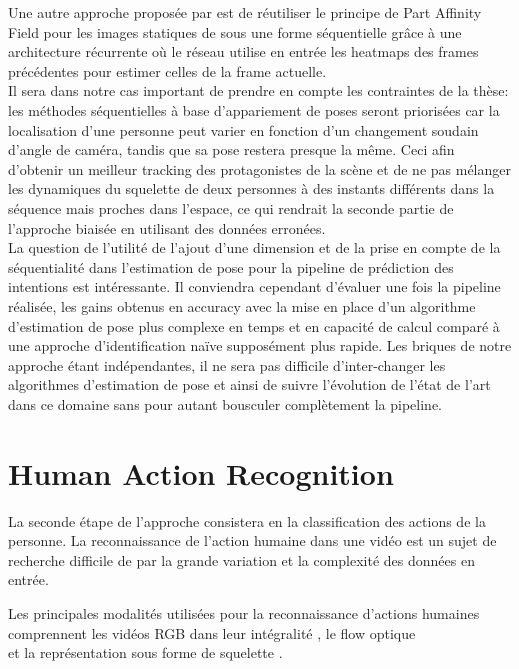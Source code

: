 Une autre approche proposée par \cite{Raaj_2019_CVPR} est de réutiliser le principe de Part Affinity Field pour les images statiques de \cite{cao2017realtime} sous une forme séquentielle grâce à une architecture récurrente où le réseau utilise en entrée les heatmaps des frames précédentes pour estimer celles de la frame actuelle.\\

Il sera dans notre cas important de prendre en compte les contraintes de la thèse: les méthodes séquentielles à base d'appariement de poses seront priorisées car la localisation d'une personne peut varier en fonction d'un changement soudain d'angle de caméra, tandis que sa pose restera presque la même. Ceci afin d'obtenir un meilleur tracking des protagonistes de la scène et de ne pas mélanger les dynamiques du squelette de deux personnes à des instants différents dans la séquence mais proches dans l'espace, ce qui rendrait la seconde partie de l'approche biaisée en utilisant des données erronées.\\

La question de l'utilité de l'ajout d'une dimension et de la prise en compte de la séquentialité dans l'estimation de pose pour la pipeline de prédiction des intentions est intéressante. Il conviendra cependant d'évaluer une fois la pipeline réalisée, les gains obtenus en accuracy avec la mise en place d'un algorithme d'estimation de pose plus complexe en temps et en capacité de calcul comparé à une approche d'identification naïve supposément plus rapide. Les briques de notre approche étant indépendantes, il ne sera pas difficile d'inter-changer les algorithmes d'estimation de pose et ainsi de suivre l'évolution de l'état de l'art dans ce domaine sans pour autant bousculer complètement la pipeline.

\section{Human Action Recognition}
\label{subsec:HAR}

La seconde étape de l'approche consistera en la classification des actions de la personne. La reconnaissance de l'action humaine dans une vidéo est un sujet de recherche difficile de par la grande variation et la complexité des données en entrée.

Les principales modalités utilisées pour la reconnaissance d'actions humaines comprennent les vidéos RGB dans leur intégralité \cite{donahue2015long,2014arXiv1412.0767T,varol2017long,Wu_2018_CVPR}, le flow optique \cite{simonyan2014two}\\\cite{zhang2016real}\cite{sevilla2018integration,DanutPOP} et la représentation sous forme de squelette \cite{vemulapalli2014human,du2015hierarchical,2016arXiv160707043L,2018arXiv180107455Y}.

